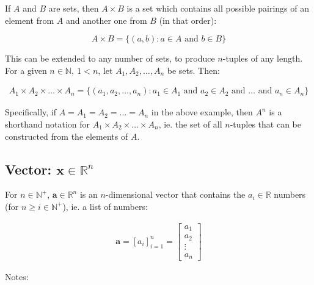 \documentclass[titlepage]{article}
\begin{document}
        If $A$ and $B$ are sets, then $A \times B$ is a set which contains all
        possible pairings of an element from $A$ and another one from $B$ (in
        that order):

        $$A \times B = \{(a, b) : a \in A \text{ and } b \in B\}$$

        This can be extended to any number of sets, to produce $n$-tuples of any
        length. For a given
        $n \in \mathbb{N},\ 1 < n$, let $A_1, A_2, \dots, A_n$ be sets. Then:

        \begin{align*}
          A_1 \times A_2 \times \dots \times A_n
            = \{
                (a_1, a_2, \dots, a_n)
                : a_1 \in A_1
                  \text{ and } a_2 \in A_2
                  \text{ and } \dots
                  \text{ and } a_n \in A_n
              \}
        \end{align*}

        Specifically, if $A = A_1 = A_2 = \dots = A_n$ in the above example,
        then $A^n$ is a shorthand notation for
        $A_1 \times A_2 \times \dots \times A_n$, ie. the set of all $n$-tuples
        that can be constructed from the elements of $A$.

      \subsection{Vector: $\mathbf{x} \in \mathbb{R}^n$}

        For $n \in \mathbb{N}^+$, $\mathbf{a} \in \mathbb{R}^n$ is an
        $n$-dimensional vector that contains the $a_i \in \mathbb{R}$ numbers
        (for $n \geq i \in \mathbb{N}^+$), ie. a list of numbers:

        \begin{align*}
          \mathbf{a} = \left[ a_i \right]_{i=1}^n
            = \begin{bmatrix}
                a_1 \\
                a_2 \\
                \vdots \\
                a_n
              \end{bmatrix}
        \end{align*}

        Notes:
\end{document}
